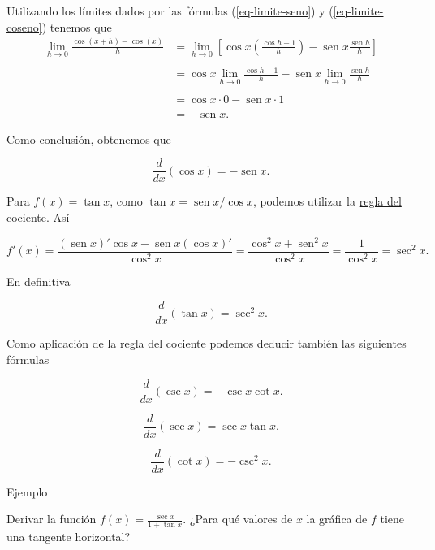 \documentclass[
  letterpaper,
]{book}
\theoremstyle{plain}
\theoremstyle{remark}
\begin{document}
Utilizando los límites dados por las fórmulas (\ref{eq-limite-seno}) y
(\ref{eq-limite-coseno}) tenemos que \[
\begin{aligned}
\lim_{h\to 0}\frac{\cos(x+h)-\cos(x)}{h}
    &=\lim_{h\to 0}\left[\cos x\left(\frac{\cos h-1}{h}\right)-\operatorname{sen} x\frac{\operatorname{sen} h}{h}\right]\\
    \\
    &=\cos x\lim_{h\to 0}\frac{\cos h-1}{h}-\operatorname{sen} x\lim_{h\to 0}\frac{\operatorname{sen} h}{h}\\
    \\
    &=\cos x\cdot 0-\operatorname{sen} x\cdot 1\\
    \\
    &=-\operatorname{sen} x.
\end{aligned}
\]

Como conclusión, obtenemos que

\[
\frac{d}{dx}(\cos x)=-\operatorname{sen} x.
\]

Para \(f(x)=\tan x\), como \(\tan x=\operatorname{sen} x/\cos x\),
podemos utilizar la \hyperref[eq-regla-cociente]{regla del cociente}.
Así

\[
f'(x)=\frac{(\operatorname{sen} x)'\cos x-\operatorname{sen} x(\cos x)'}{\cos^2 x}=\frac{\cos^2 x+\operatorname{sen}^2 x}{\cos^2 x}=\frac{1}{\cos^2 x}=\sec^2 x.
\]

En definitiva

\[
\frac{d}{dx}(\tan x)=\sec^2 x.
\]

Como aplicación de la regla del cociente podemos deducir también las
siguientes fórmulas

\[
\frac{d}{dx}(\csc x)=-\csc x\cot x.
\]

\[
\frac{d}{dx}(\sec x)=\sec x\tan x.
\]

\[
\frac{d}{dx}(\cot x)=-\csc^2 x.
\]

Ejemplo

Derivar la función \(\displaystyle f(x)=\frac{\sec x}{1+\tan x}\). ¿Para
qué valores de \(x\) la gráfica de \(f\) tiene una tangente horizontal?
\end{document}
